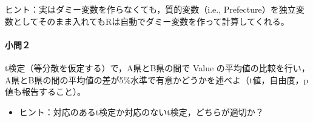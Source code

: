 \documentclass[]{article}
\newenvironment{Shaded}{\begin{snugshade}}{\end{snugshade}}
\newcommand{\KeywordTok}[1]{\textcolor[rgb]{0.13,0.29,0.53}{\textbf{#1}}}
\newcommand{\DecValTok}[1]{\textcolor[rgb]{0.00,0.00,0.81}{#1}}
\newcommand{\StringTok}[1]{\textcolor[rgb]{0.31,0.60,0.02}{#1}}
\newcommand{\CommentTok}[1]{\textcolor[rgb]{0.56,0.35,0.01}{\textit{#1}}}
\newcommand{\OperatorTok}[1]{\textcolor[rgb]{0.81,0.36,0.00}{\textbf{#1}}}
\newcommand{\NormalTok}[1]{#1}
\providecommand{\tightlist}{%
  \setlength{\itemsep}{0pt}\setlength{\parskip}{0pt}}
\let\oldparagraph\paragraph
\renewcommand{\paragraph}[1]{\oldparagraph{#1}\mbox{}}
\begin{document}
\begin{Shaded}
\end{Shaded}

ヒント：実はダミー変数を作らなくても，質的変数（i.e.,
Prefecture）を独立変数としてそのまま入れてもRは自動でダミー変数を作って計算してくれる。

\paragraph{小問２}\label{-5}

t検定（等分散を仮定する）で，A県とB県の間で Value
の平均値の比較を行い，A県とB県の間の平均値の差が5\%水準で有意かどうかを述べよ（t値，自由度，p値も報告すること）。

\begin{itemize}
\tightlist
\item
  ヒント：対応のあるt検定か対応のないt検定，どちらが適切か？
\end{itemize}
\end{document}
